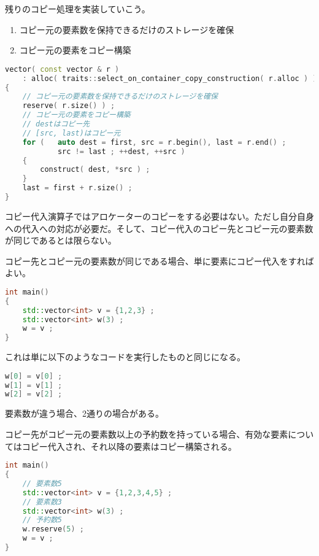 残りのコピー処理を実装していこう。

\begin{enumerate}
\def\labelenumi{\arabic{enumi}.}
\item
  コピー元の要素数を保持できるだけのストレージを確保
\item
  コピー元の要素をコピー構築
\end{enumerate}

\ifTombow\pagebreak\fi
\begin{lstlisting}[language={C++}]
vector( const vector & r )
    : alloc( traits::select_on_container_copy_construction( r.alloc ) )
{
    // コピー元の要素数を保持できるだけのストレージを確保
    reserve( r.size() ) ;
    // コピー元の要素をコピー構築
    // destはコピー先
    // [src, last)はコピー元
    for (   auto dest = first, src = r.begin(), last = r.end() ;
            src != last ; ++dest, ++src )
    {
        construct( dest, *src ) ;
    }
    last = first + r.size() ;
}
\end{lstlisting}


コピー代入演算子ではアロケーターのコピーをする必要はない。ただし自分自身への代入への対応が必要だ。そして、コピー代入のコピー先とコピー元の要素数が同じであるとは限らない。

コピー先とコピー元の要素数が同じである場合、単に要素にコピー代入をすればよい。

\begin{lstlisting}[language={C++}]
int main()
{
    std::vector<int> v = {1,2,3} ;
    std::vector<int> w(3) ;
    w = v ;
}
\end{lstlisting}

これは単に以下のようなコードを実行したものと同じになる。

\begin{lstlisting}[language={C++}]
w[0] = v[0] ;
w[1] = v[1] ;
w[2] = v[2] ;
\end{lstlisting}

要素数が違う場合、2通りの場合がある。

コピー先がコピー元の要素数以上の予約数を持っている場合、有効な要素についてはコピー代入され、それ以降の要素はコピー構築される。

\ifTombow\pagebreak\fi
\begin{lstlisting}[language={C++}]
int main()
{
    // 要素数5
    std::vector<int> v = {1,2,3,4,5} ;
    // 要素数3
    std::vector<int> w(3) ;
    // 予約数5
    w.reserve(5) ;
    w = v ;
}
\end{lstlisting}

